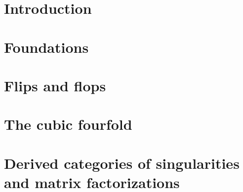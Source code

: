 
\section{Introduction}


\newpage
\section{Foundations}


\newpage
\section{Flips and flops}


\newpage
\section{The cubic fourfold}


\newpage
\section{Derived categories of singularities and matrix factorizations}

